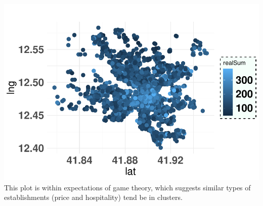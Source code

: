 \documentclass[
]{article}
\begin{document}
\includegraphics{Project_Prelim_report_files/figure-latex/unnamed-chunk-8-1.pdf}
This plot is within expectations of game theory, which suggests similar
types of establishments (price and hospitality) tend be in clusters.
\end{document}
